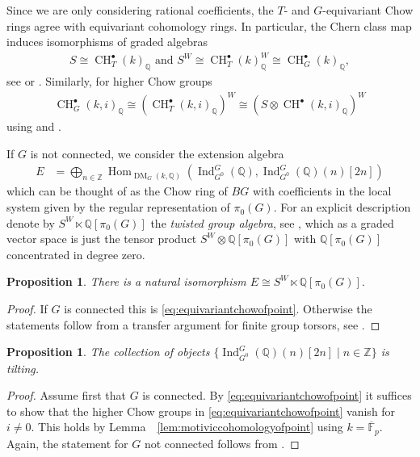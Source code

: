 \documentclass{amsart}
\theoremstyle{plain}
\newtheorem{proposition}[theorem]{Proposition}
\theoremstyle{TheoremNum}
\theoremstyle{definition}
\theoremstyle{remark}
\numberwithin{equation}{section}
\newcommand{\F}{\mathbb{F}}
\newcommand{\Q}{\mathbb{Q}}
\newcommand{\Z}{\mathbb{Z}}
\newcommand{\Chow}{\operatorname{CH}}
\newcommand{\DM}{\operatorname{DM}}
\newcommand{\Hom}{\operatorname{Hom}}
\newcommand{\Ind}{\operatorname{Ind}}
\begin{document}
Since we are only considering rational coefficients, the $T$- and $G$-equivariant Chow rings agree with equivariant cohomology rings. In particular, the Chern class map induces isomorphisms of graded algebras
\begin{align}
    S\cong \Chow^\bullet_T(k)_\Q \text{ and }
    S^W\cong \Chow^\bullet_T(k)_\Q^W\cong\Chow^\bullet_G(k)_\Q\label{eq:equivariantchowofpoint},
\end{align}
see \cite{raskind_chow_1999} or \cite[Section 3.2]{edidin_equivariant_1998}. Similarly, for higher Chow groups
\begin{align}\label{eq:higherequivariantchowofpoint}
    \Chow^\bullet_G(k,i)_\Q\cong(\Chow^\bullet_T(k,i)_\Q)^W\cong (S\otimes\Chow^\bullet(k,i)_\Q)^W
\end{align}
using \cite[Theorem 1.5]{krishna_equivariant_2017} and \cite[Theorem 5.7]{krishna_higher_2013}. 

If $G$ is not connected, we consider the extension algebra
\begin{align*}
    E&=\bigoplus_{n\in \Z}\Hom_{\DM_G(k,\Q)}(\Ind^G_{G^0}(\Q),\Ind^G_{G^0}(\Q)(n)[2n])
\end{align*}
which can be thought of as the Chow ring of $BG$ with coefficients in the local system given by the regular representation of $\pi_0(G).$ For an explicit description denote by $S^W\ltimes \Q[\pi_0(G)]$ the \emph{twisted group algebra}, see \cite[A.2.3]{soergel_equivariant_2018}, which as a graded vector space is just the tensor product  $S^W\otimes \Q[\pi_0(G)]$ with $\Q[\pi_0(G)]$ concentrated in degree zero.
\begin{proposition}\label{prop:extofpoint}
There is a natural isomorphism 
$E\cong S^W\ltimes \Q[\pi_0(G)].$
\end{proposition}
\begin{proof}
If $G$ is connected this is \eqref{eq:equivariantchowofpoint}. Otherwise the statements follow from a transfer argument for finite group torsors, see \cite[Section A.2.2]{soergel_equivariant_2018}.
\end{proof}
\begin{proposition}\label{prop:tiltingpointequivariant}
The collection of objects $\{\Ind^G_{G^0}(\Q)(n)[2n]\mid n\in \Z\}$ is tilting.
\end{proposition}
\begin{proof}
Assume first that $G$ is connected. By \eqref{eq:equivariantchowofpoint} it suffices to show that the higher Chow groups in \eqref{eq:equivariantchowofpoint} vanish for $i\neq0.$ This holds by Lemma~~\ref{lem:motiviccohomologyofpoint} using  $k=\overline{\F}_p.$ Again, the statement for $G$ not connected follows from \cite[Section A.2.2]{soergel_equivariant_2018}.
\end{proof}
\end{document}

